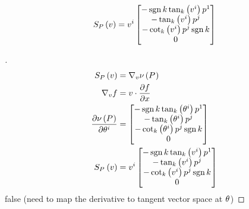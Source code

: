 \documentclass[stu, babel, american, biblatex, a4paper, draftall]{apa7}
\begin{document}
\begin{lemma}\label{Model:ShapeOperator}
    \begin{equation*}
        S_{P}\left(v\right)
        = \tensor{v}{^i} \begin{bmatrix}
            -\sign{k}\tan_k\left(\tensor{v}{^i}\right)\tensor{p}{^1} \\
            -\tan_k\left(\tensor{v}{^i}\right)\tensor{p}{^j}         \\
            -\cot_k\left(\tensor{v}{^i}\right)\tensor{p}{^j}\sign{k} \\
            0                                                        \\
        \end{bmatrix}
    \end{equation*}
\end{lemma}
\begin{proof}[]
    \skipped

    \begin{align*}
        S_{P}\left(v\right)
                   & = \nabla_v \nu\left(\tensor{P}{}\right)     \\
        \nabla_v f & = v \cdot \frac{\partial f}{\partial x}     \\
        \frac{\partial\nu\left(\tensor{P}{}\right)}{\partial\tensor{\theta}{^i}}
                   & = \begin{bmatrix}
            -\sign{k}\tan_k\left(\tensor{\theta}{^i}\right)\tensor{p}{^1} \\
            -\tan_k\left(\tensor{\theta}{^i}\right)\tensor{p}{^j}         \\
            -\cot_k\left(\tensor{\theta}{^i}\right)\tensor{p}{^j}\sign{k} \\
            0                                                             \\
        \end{bmatrix}                \\
        S_{\tensor{P}{}}\left(v\right)
                   & = \tensor{v}{^i} \begin{bmatrix}
            -\sign{k}\tan_k\left(\tensor{v}{^i}\right)\tensor{p}{^1} \\
            -\tan_k\left(\tensor{v}{^i}\right)\tensor{p}{^j}         \\
            -\cot_k\left(\tensor{v}{^i}\right)\tensor{p}{^j}\sign{k} \\
            0                                                        \\
        \end{bmatrix}
    \end{align*}
    false (need to map the derivative to tangent vector space at $\tensor{\theta}{}$)
\end{proof}
\end{document}
